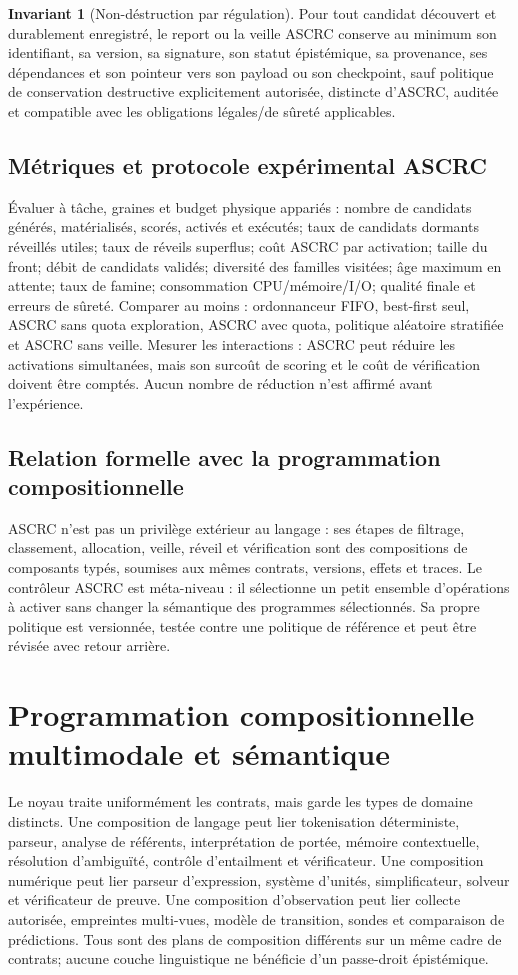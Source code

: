 \documentclass[11pt,a4paper]{article}
\theoremstyle{definition}
\newtheorem{invariant}[definition]{Invariant}
\theoremstyle{plain}
\theoremstyle{remark}
\begin{document}
\begin{invariant}[Non-déstruction par régulation]
Pour tout candidat découvert et durablement enregistré, le report ou la veille ASCRC conserve au minimum son identifiant, sa version, sa signature, son statut épistémique, sa provenance, ses dépendances et son pointeur vers son payload ou son checkpoint, sauf politique de conservation destructive explicitement autorisée, distincte d'ASCRC, auditée et compatible avec les obligations légales/de sûreté applicables.
\end{invariant}

\subsection{Métriques et protocole expérimental ASCRC}
Évaluer à tâche, graines et budget physique appariés : nombre de candidats générés, matérialisés, scorés, activés et exécutés; taux de candidats dormants réveillés utiles; taux de réveils superflus; coût ASCRC par activation; taille du front; débit de candidats validés; diversité des familles visitées; âge maximum en attente; taux de famine; consommation CPU/mémoire/I/O; qualité finale et erreurs de sûreté. Comparer au moins : ordonnanceur FIFO, best-first seul, ASCRC sans quota exploration, ASCRC avec quota, politique aléatoire stratifiée et ASCRC sans veille. Mesurer les interactions : ASCRC peut réduire les activations simultanées, mais son surcoût de scoring et le coût de vérification doivent être comptés. Aucun nombre de réduction n'est affirmé avant l'expérience.

\subsection{Relation formelle avec la programmation compositionnelle}
ASCRC n'est pas un privilège extérieur au langage : ses étapes de filtrage, classement, allocation, veille, réveil et vérification sont des compositions de composants typés, soumises aux mêmes contrats, versions, effets et traces. Le contrôleur ASCRC est méta-niveau : il sélectionne un petit ensemble d'opérations à activer sans changer la sémantique des programmes sélectionnés. Sa propre politique est versionnée, testée contre une politique de référence et peut être révisée avec retour arrière.

\section{Programmation compositionnelle multimodale et sémantique}
Le noyau traite uniformément les contrats, mais garde les types de domaine distincts. Une composition de langage peut lier tokenisation déterministe, parseur, analyse de référents, interprétation de portée, mémoire contextuelle, résolution d'ambiguïté, contrôle d'entailment et vérificateur. Une composition numérique peut lier parseur d'expression, système d'unités, simplificateur, solveur et vérificateur de preuve. Une composition d'observation peut lier collecte autorisée, empreintes multi-vues, modèle de transition, sondes et comparaison de prédictions. Tous sont des plans de composition différents sur un même cadre de contrats; aucune couche linguistique ne bénéficie d'un passe-droit épistémique.
\end{document}
